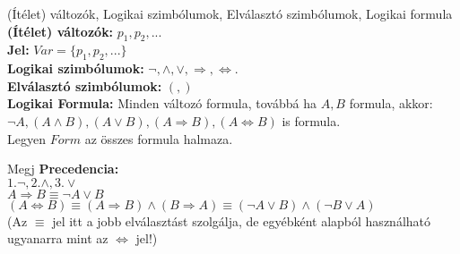 \documentclass{beamer}
\begin{document}
\begin{frame}[plain]
\end{frame}


\begin{frame}[plain]
\end{frame}

\begin{frame}

\begin{block}{(Ítélet) változók, Logikai szimbólumok, Elválasztó szimbólumok, Logikai formula}
\bigskip
\textbf{(Ítélet) változók:} $p_1, p_2, ...$\\
\hspace{1ex} \textbf{Jel: } $Var = \{p_1, p_2, ...\}$\\
\bigskip
\textbf{Logikai szimbólumok:} ${\neg}, {\land}, {\lor}, {\Rightarrow}, {\iff}.$\\
\bigskip
\textbf{Elválasztó szimbólumok:} $(, )$\\
\bigskip
\textbf{Logikai Formula:} Minden változó formula, továbbá ha $A, B$ formula, akkor:\\
\textbf{${\neg}A, (A \land B), (A \lor B), (A \Rightarrow B), (A \iff B)$} is formula.\\
\bigskip
Legyen $Form$ az összes formula halmaza.

\end{block}

\begin{block}{Megj}
\textbf{Precedencia:}\\ 
\bigskip
$1. {\neg}, 2. {\land}, 3. {\lor}$\\
\bigskip
$A \Rightarrow B \equiv {\neg}A \lor B$\\
$(A \iff B) \equiv (A \Rightarrow B) \land (B \Rightarrow A) \equiv ({\neg}A \lor B) \land ({\neg}B \lor A)$\\
\bigskip
(Az $\equiv$ jel itt a jobb elválasztást szolgálja, de egyébként alapból használható ugyanarra mint az $\iff$ jel!)

\end{block}

\end{frame}
\end{document}
